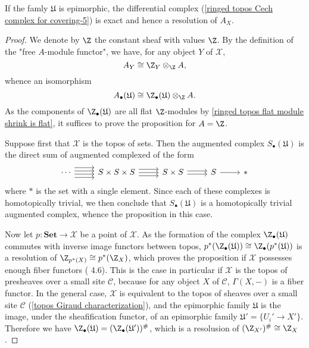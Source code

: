 \begin{proposition}\label{ringed topos Cech complex resolution for epimorphic}
If the famly $\mathfrak{U}$ is epimorphic, the differential complex (\ref{ringed topos Cech complex for covering-5}) is exact and hence a resolution of $A_X$.
\end{proposition}
\begin{proof}
We denote by $\Z$ the constant sheaf with values $\Z$. By the definition of the "free $A$-module functor", we have, for any object $Y$ of $\mathcal{X}$,
\[A_Y\cong\Z_Y\otimes_\Z A,\]
whence an isomorphism
\[A_\bullet(\mathfrak{U})\cong\Z_\bullet(\mathfrak{U})\otimes_\Z A.\]
As the components of $\Z_\bullet(\mathfrak{U})$ are all flat $\Z$-modules by \cref{ringed topos flat module shrink is flat}, it suffices to prove the proposition for $A=\Z$.\par
Suppose first that $\mathcal{X}$ is the topos of sets. Then the augmented complex $S_\bullet(\mathfrak{U})$ is the direct sum of augmented complexed of the form
\[\begin{tikzcd}
\cdots\ar[r,shift left=6pt]\ar[r,shift left=2pt]\ar[r,shift right=2pt]\ar[r,shift right=6pt]
&S\times S\times S\ar[r,shift left=4pt]\ar[r,shift right=4pt]\ar[r]
&S\times S\ar[r,shift left=2pt]\ar[r,shift right=2pt]
&S\ar[r]&\ast
\end{tikzcd}\]
where $\ast$ is the set with a single element. Since each of these complexes is homotopically trivial, we then conclude that $S_\bullet(\mathfrak{U})$ is a homotopically trivial augmented complex, whence the proposition in this case.\par
Now let $p:\mathbf{Set}\to \mathcal{X}$ be a point of $\mathcal{X}$. As the formation of the complex $\Z_\bullet(\mathfrak{U})$ commutes with inverse image functors between topos, $p^*(\Z_\bullet(\mathfrak{U}))\cong\Z_\bullet(p^*(\mathfrak{U}))$ is a resolution of $\Z_{p^*(X)}\cong p^*(\Z_X)$, which proves the proposition if $\mathcal{X}$ possesses enough fiber functors (\cite{SGA4-1}  4.6). This is the case in particular if $\mathcal{X}$ is the topos of presheaves over a small site $\mathcal{C}$, because for any object $X$ of $\mathcal{C}$, $\Gamma(X,-)$ is a fiber functor. In the general case, $\mathcal{X}$ is equivalent to the topos of sheaves over a small site $\mathcal{C}$ (\cref{topos Giraud characterization}), and the epimorphic family $\mathfrak{U}$ is the image, under the sheafification functor, of an epimorphic family $\mathfrak{U}'=\{U_i'\to X'\}$. Therefore we have $\Z_\bullet(\mathfrak{U})=(\Z_\bullet(\mathfrak{U}'))^\#$, which is a resolusion of $(\Z_{X'})^\#\cong\Z_X$.
\end{proof}

